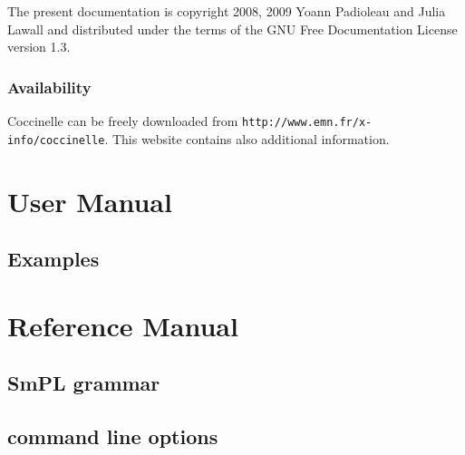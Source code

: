 \documentclass{report}
\begin{document}
The present documentation is copyright 2008, 2009 Yoann Padioleau
and Julia Lawall and distributed under the terms of the
GNU Free Documentation License version 1.3.

\section*{Availability}

Coccinelle can be freely downloaded
from \verb+http://www.emn.fr/x-info/coccinelle+.
This website contains also additional information.


\part{User Manual}
\label{part:usermanual}







\chapter{Examples}
















\part{Reference Manual}
\label{part:refmanual}

\chapter{SmPL grammar}



\chapter{\spatch command line options}





{\small


}


\end{document}
